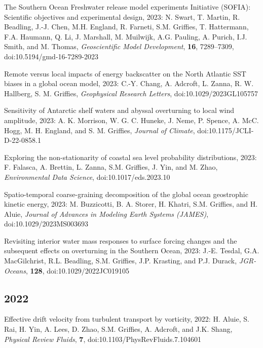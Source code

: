 \begin{etaremune}
\item The Southern Ocean Freshwater release model experiments Initiative (SOFIA): Scientific objectives and experimental design, 2023: N. Swart, T. Martin, R. Beadling, J.-J. Chen, M.H. England, R. Farneti, S.M. Grif\/f\/ies, T. Hattermann, F.A. Haumann, Q. Li, J. Marshall, M. Muilwijk, A.G. Pauling, A. Purich, I.J. Smith, and M. Thomas,  {\it Geoscientific Model Development}, {\bf 16}, 7289–7309, doi:10.5194/gmd-16-7289-2023





\item Remote versus local impacts of energy backscatter on the North Atlantic SST biases in a global ocean model, 2023: C.-Y. Chang,  A. Adcroft, L. Zanna, R. W. Hallberg, S. M. Grif\/f\/ies, {\it  Geophysical Research Letters}, doi:10.1029/2023GL105757

\item Sensitivity of Antarctic shelf waters and abyssal overturning to local wind amplitude, 2023: A. K. Morrison, W. G. C. Huneke, J. Neme, P. Spence, A. McC. Hogg, M. H. England, and S. M. Grif\/f\/ies, {\it Journal of Climate}, doi:10.1175/JCLI-D-22-0858.1

\item Exploring the non-stationarity of coastal sea level probability distributions, 2023: F. Falasca, A. Brettin, L. Zanna, S.M. Grif\/f\/ies, J. Yin, and M. Zhao, {\it Environmental Data Science}, doi:10.1017/eds.2023.10

\item Spatio-temporal coarse-graining decomposition of the global ocean geostrophic kinetic energy, 2023:  M. Buzzicotti, B. A. Storer, H. Khatri, S.M. Grif\/f\/ies, and H. Aluie, {\it Journal of Advances in Modeling Earth Systems (JAMES)},
doi:10.1029/2023MS003693

\item Revisiting interior water mass responses to surface forcing changes and the subsequent effects on overturning in the Southern Ocean, 2023: J.-E. Tesdal, G.A. MacGilchrist, R.L. Beadling, S.M. Grif\/f\/ies, J.P. Krasting, and P.J. Durack, {\it JGR-Oceans}, {\bf 128}, doi:10.1029/2022JC019105


\subsection*{\sc \color{Maroon} 2022}

\item Effective drift velocity from turbulent transport by vorticity, 2022: H. Aluie, S. Rai, H. Yin, A. Lees, D. Zhao, S.M. Grif\/f\/ies, A. Adcroft, and J.K. Shang, {\it  Physical Review Fluids}, {\bf 7}, doi:10.1103/PhysRevFluids.7.104601


\end{etaremune}
